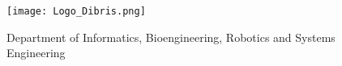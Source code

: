 \vspace{2em}
\vfill
\begin{figure}[h!]
 \centering
 \texttt{[image: Logo\_Dibris.png]}
\begin{center} 
		\small{Department of Informatics, Bioengineering, Robotics and Systems Engineering\\}
	\end{center}
\end{figure}
	


